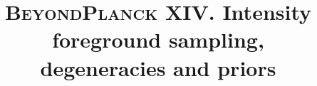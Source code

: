 \documentclass[twocolumn]{aa}
\def\commander{\texttt{Commander}}
\newcommand{\BP}{\textsc{BeyondPlanck}}
\begin{document}
\title{\bfseries{\scshape{BeyondPlanck}} XIV. Intensity foreground
  sampling,\\ degeneracies and priors}



  
\end{document}
